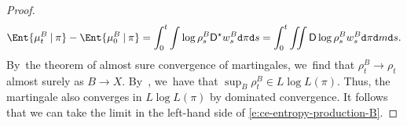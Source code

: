 \documentclass[10pt]{amsart}
\theoremstyle{definition}
\theoremstyle{remark}
\newcommand{\given}[1][]{%
\nonscript\:#1\vert
\allowbreak
\nonscript\:
\mathopen{}}
\begin{document}
\begin{proof}
\begin{equation}\label{e:ce-entropy-production-B}
\Ent{ \mu_{t}^{B} \given \pi } - \Ent{ \mu_{0}^{B} \given \pi } = \int_{0}^{t} \int \log \rho^{B}_{s} \mathsf{D}^{\star} w^{B}_{s} \mathtt{d} \pi \mathtt{d} s = \int _{0}^{t} \iint \mathsf{D} \log \rho^{B}_{s} w^{B}_{s} \mathtt{d} \pi \mathtt{d} m \mathtt{d} s.
\end{equation}
By~the theorem of almost sure convergence of martingales, we~find that $\rho^{B}_{t} \to \rho_{t}$ almost surely as $B \to X$.
By~\cite[Eq.\,103.1, p.\,186]{DellacherieMeyerMartingales}, we~have that $\sup_{B} \rho^{B}_{t} \in L \log L(\pi)$.
Thus, the martingale also converges in $L \log L(\pi)$ by dominated convergence.
It follows that we can take the limit in the left-hand side of \cref{e:ce-entropy-production-B}.


\end{proof}
\end{document}
